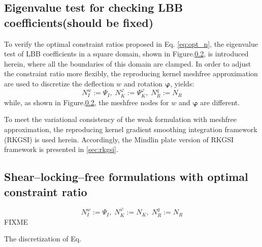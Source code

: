 \subsection{Eigenvalue test for checking LBB coefficients(should be fixed)}
To verify the optimal constraint ratios proposed in Eq. \eqref{eq:opt_n},
the eigenvalue test of LBB coefficients \cite{bathe2001} in a square domain, shown in Figure.\ref{}, is introduced herein, where all the boundaries of this domain are clamped.
In order to adjust the constraint ratio more flexibly, 
the reproducing kernel meshfree approximation are used to discretize the deflection $w$ and rotation $\boldsymbol \varphi$, yields:
\begin{equation}
    N^w_I := \Psi_I,\; N^\varphi_K := \Psi_K^\varphi,\; N^q_R := N_R
\end{equation}
while, as shown in Figure.\ref{}, the meshfree nodes for $w$ and $\boldsymbol \varphi$ are different. 

To meet the variational consistency of the weak formulation with meshfree approximation, the reproducing kernel gradient smoothing integration framework (RKGSI) \cite{wu2023} is used herein. 
Accordingly, the Mindlin plate version of RKGSI framework is presented in \ref{sec:rkgsi}.
\subsection{Shear--locking--free formulations with optimal constraint ratio}

\begin{equation}
    N^w_I := \Psi_I,\; N^\varphi_K := N_K,\; N^q_R := N_R
\end{equation}
FIXME
\begin{rmk}
The discretization of Eq. 
\end{rmk}